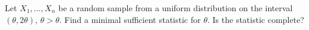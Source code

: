 \documentclass[12pt,letterpaper]{exam}
\begin{document}
\begin{questions}
	
	\begin{solution}
		\begin{parts}
			\part
			\part
			\part
			\part
			\part
		\end{parts}
	\end{solution}
	
	\setcounter{question}{22}
	\question 
	Let \(X_1, \ldots, X_n\) be a random sample from a uniform distribution on the interval 
	\((\theta, 2\theta)\), \(\theta > \theta\). Find a minimal sufficient statistic for \(\theta\). 
	Is the statistic complete?
	
	\begin{solution}
		
	\end{solution}

\end{questions}
\end{document}

